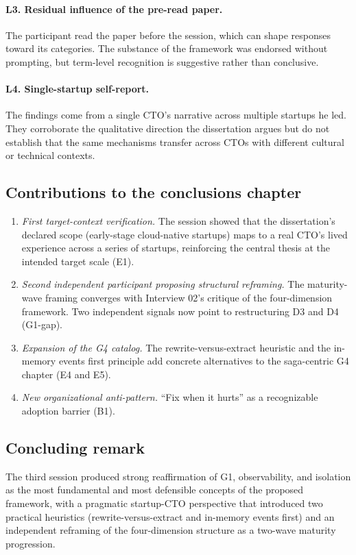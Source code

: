 \paragraph*{L3. Residual influence of the pre-read paper.} The participant read the paper before the session, which can shape responses toward its categories. The substance of the framework was endorsed without prompting, but term-level recognition is suggestive rather than conclusive.

\paragraph*{L4. Single-startup self-report.} The findings come from a single CTO's narrative across multiple startups he led. They corroborate the qualitative direction the dissertation argues but do not establish that the same mechanisms transfer across CTOs with different cultural or technical contexts.

\subsection*{Contributions to the conclusions chapter}

\begin{enumerate}[itemsep=3pt,topsep=2pt]
  \item \emph{First target-context verification.} The session showed that the dissertation's declared scope (early-stage cloud-native startups) maps to a real CTO's lived experience across a series of startups, reinforcing the central thesis at the intended target scale (E1).
  \item \emph{Second independent participant proposing structural reframing.} The maturity-wave framing converges with Interview 02's critique of the four-dimension framework. Two independent signals now point to restructuring D3 and D4 (G1-gap).
  \item \emph{Expansion of the G4 catalog.} The rewrite-versus-extract heuristic and the in-memory events first principle add concrete alternatives to the saga-centric G4 chapter (E4 and E5).
  \item \emph{New organizational anti-pattern.} ``Fix when it hurts'' as a recognizable adoption barrier (B1).
\end{enumerate}

\subsection*{Concluding remark}

The third session produced strong reaffirmation of G1, observability, and isolation as the most fundamental and most defensible concepts of the proposed framework, with a pragmatic startup-CTO perspective that introduced two practical heuristics (rewrite-versus-extract and in-memory events first) and an independent reframing of the four-dimension structure as a two-wave maturity progression.
